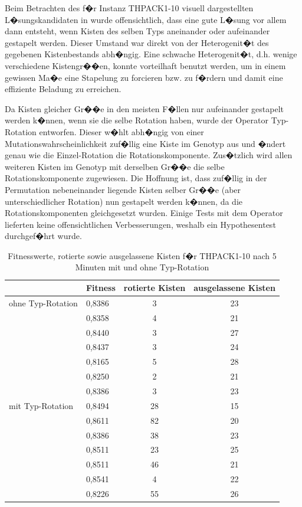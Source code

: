 \documentclass[a4paper,abstracton,12pt]{scrartcl}
\begin{document}
Beim Betrachten des f�r Instanz THPACK1-10 visuell dargestellten L�sungskandidaten in \cite{eley2002} wurde offensichtlich, dass eine gute L�sung vor allem dann entsteht, wenn Kisten des selben Typs aneinander oder aufeinander gestapelt werden. Dieser Umstand war direkt von der Heterogenit�t des gegebenen Kistenbestands abh�ngig. Eine schwache Heterogenit�t, d.h. wenige verschiedene Kistengr��en, konnte vorteilhaft benutzt werden, um in einem gewissen Ma�e eine Stapelung zu forcieren bzw. zu f�rdern und damit eine effiziente Beladung zu erreichen.

Da Kisten gleicher Gr��e in den meisten F�llen nur aufeinander gestapelt werden k�nnen, wenn sie die selbe Rotation haben, wurde der Operator Typ-Rotation entworfen. Dieser w�hlt abh�ngig von einer Mutationswahrscheinlichkeit zuf�llig eine Kiste im Genotyp aus und �ndert genau wie die Einzel-Rotation die Rotationskomponente. Zus�tzlich wird allen weiteren Kisten im Genotyp mit derselben Gr��e die selbe Rotationskomponente zugewiesen. Die Hoffnung ist, dass zuf�llig in der Permutation nebeneinander liegende Kisten selber Gr��e (aber unterschiedlicher Rotation) nun gestapelt werden k�nnen, da die Rotationskomponenten gleichgesetzt wurden. Einige Tests mit dem Operator lieferten keine offensichtlichen Verbesserungen, weshalb ein Hypothesentest durchgef�hrt wurde.

\begin{table}
  \caption{Fitnesswerte, rotierte sowie ausgelassene Kisten f�r THPACK1-10 nach 5 Minuten mit und ohne Typ-Rotation}
  \label{tbl:stackrotation}
	\centering
	\begin{tabular}{l|l|c|c}
	 & Fitness & rotierte Kisten & ausgelassene Kisten \\ 
	\hline
	ohne Typ-Rotation & 0,8386 & 3 & 23 \\ 
	 & 0,8358 & 4 & 21 \\ 
	 & 0,8440 & 3 & 27 \\ 
	 & 0,8437 & 3 & 24 \\ 
	 & 0,8165 & 5 & 28 \\ 
	 & 0,8250 & 2 & 21 \\ 
	 & 0,8386 & 3 & 23 \\ 
	\hline
	mit Typ-Rotation & 0,8494 & 28 & 15 \\ 
	 & 0,8611 & 82 & 20 \\ 
	 & 0,8386 & 38 & 23 \\ 
	 & 0,8511 & 23 & 25 \\ 
	 & 0,8511 & 46 & 21 \\ 
	 & 0,8541 & 4 & 22 \\ 
	 & 0,8226 & 55 & 26 \\ 
	\end{tabular}
\end{table}
\end{document}
